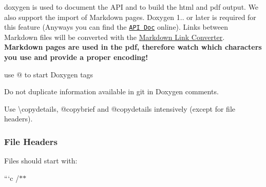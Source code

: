 {\ttfamily doxygen} is used to document the A\+PI and to build the html and pdf output. We also support the import of Markdown pages. Doxygen 1.. or later is required for this feature (Anyways you can find the \href{https://doc.libelektra.org/api/latest/html/}{\tt A\+PI Doc} online). Links between Markdown files will be converted with the \hyperlink{doc_markdownlinkconverter_README_md}{Markdown Link Converter}. {\bfseries Markdown pages are used in the pdf, therefore watch which characters you use and provide a proper encoding!}


\begin{DoxyItemize}
\item use {\ttfamily @} to start Doxygen tags
\item Do not duplicate information available in git in Doxygen comments.
\item Use {\ttfamily \textbackslash{}copydetails}, {\ttfamily @copybrief} and {\ttfamily @copydetails} intensively (except for file headers).
\end{DoxyItemize}

\subsubsection*{File Headers}

Files should start with\+:

```c /$\ast$$\ast$
\begin{DoxyItemize}
\item 
\end{DoxyItemize}
